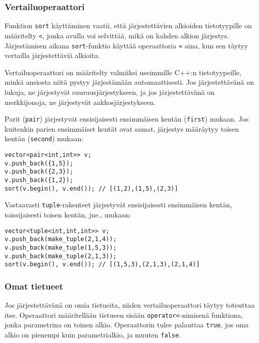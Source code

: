 \subsubsection{Vertailuoperaattori}


Funktion \texttt{sort} käyttäminen vaatii,
että järjestettävien alkioiden
tietotyypille on määritelty  \texttt{<},
jonka avulla voi selvittää, mikä on kahden alkion järjestys.
Järjestämisen aikana \texttt{sort}-funktio
käyttää operaattoria \texttt{<} aina, kun sen täytyy
vertailla järjestettäviä alkioita.

Vertailuoperaattori on määritelty valmiiksi
useimmille C++:n tietotyypeille,
minkä ansiosta niitä pystyy järjestämään automaattisesti.
Jos järjestettävänä on lukuja, ne järjestyvät
suuruusjärjestykseen,
ja jos järjestettävänä on merkkijonoja,
ne järjestyvät aakkosjärjestykseen.


Parit (\texttt{pair}) järjestyvät ensisijaisesti
ensimmäisen kentän (\texttt{first}) mukaan.
Jos kuitenkin parien ensimmäiset kentät ovat samat,
järjestys määräytyy toisen kentän (\texttt{second}) mukaan:
\begin{lstlisting}
vector<pair<int,int>> v;
v.push_back({1,5});
v.push_back({2,3});
v.push_back({1,2});
sort(v.begin(), v.end()); // [(1,2),(1,5),(2,3)]
\end{lstlisting}


Vastaavasti \texttt{tuple}-rakenteet
järjestyvät ensisijaisesti ensimmäisen kentän,
toissijaisesti toisen kentän, jne., mukaan:
\begin{lstlisting}
vector<tuple<int,int,int>> v;
v.push_back(make_tuple(2,1,4));
v.push_back(make_tuple(1,5,3));
v.push_back(make_tuple(2,1,3));
sort(v.begin(), v.end()); // [(1,5,3),(2,1,3),(2,1,4)]
\end{lstlisting}

\subsubsection{Omat tietueet}

Jos järjestettävänä on omia tietueita,
niiden vertailuoperaattori täytyy toteuttaa itse.
Operaattori määritellään tietueen sisään
\texttt{operator<}-nimisenä funktiona,
jonka parametrina on toinen alkio.
Operaattorin tulee palauttaa \texttt{true},
jos oma alkio on pienempi kuin parametrialkio,
ja muuten \texttt{false}.

